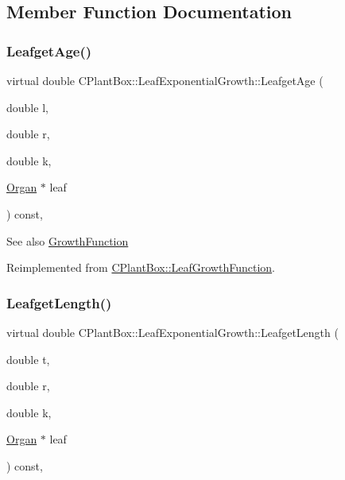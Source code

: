 \subsection{Member Function Documentation}
\mbox{\label{classCPlantBox_1_1LeafExponentialGrowth_a31eabefa43aee62945250d7a909a3cee}} 
\subsubsection{\texorpdfstring{Leafget\+Age()}{LeafgetAge()}}
{\footnotesize\ttfamily virtual double C\+Plant\+Box\+::\+Leaf\+Exponential\+Growth\+::\+Leafget\+Age (\begin{DoxyParamCaption}\item[{double}]{l,  }\item[{double}]{r,  }\item[{double}]{k,  }\item[{\hyperlink{classCPlantBox_1_1Organ}{Organ} $\ast$}]{leaf }\end{DoxyParamCaption}) const\hspace{0.3cm}{\ttfamily [inline]}, {\ttfamily [virtual]}}

\begin{DoxySeeAlso}{See also}
\hyperlink{classCPlantBox_1_1GrowthFunction}{Growth\+Function} 
\end{DoxySeeAlso}


Reimplemented from \hyperlink{classCPlantBox_1_1LeafGrowthFunction_a0893ec299fbd7566792e2ef9e2f58f2f}{C\+Plant\+Box\+::\+Leaf\+Growth\+Function}.

\mbox{\label{classCPlantBox_1_1LeafExponentialGrowth_a734c28895db7e1c378d5431d712a53c9}} 
\subsubsection{\texorpdfstring{Leafget\+Length()}{LeafgetLength()}}
{\footnotesize\ttfamily virtual double C\+Plant\+Box\+::\+Leaf\+Exponential\+Growth\+::\+Leafget\+Length (\begin{DoxyParamCaption}\item[{double}]{t,  }\item[{double}]{r,  }\item[{double}]{k,  }\item[{\hyperlink{classCPlantBox_1_1Organ}{Organ} $\ast$}]{leaf }\end{DoxyParamCaption}) const\hspace{0.3cm}{\ttfamily [inline]}, {\ttfamily [virtual]}}

